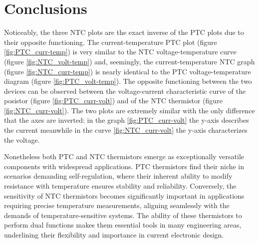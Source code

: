 \vspace{30px}\section{Conclusions}
Noticeably, the three NTC plots are the exact inverse of the PTC plots due to their opposite functioning. The current-temperature PTC plot (figure \ref{fig:PTC_curr-temp}) is very similar to the NTC voltage-temperature curve (figure \ref{fig:NTC_volt-temp}) and, seemingly, the current-temperature NTC graph (figure \ref{fig:NTC_curr-temp}) is nearly identical to the PTC voltage-temperature diagram (figure \ref{fig:PTC_volt-temp}). The opposite functioning between the two devices can be observed between the voltage-current characteristic curve of the posistor (figure \ref{fig:PTC_curr-volt}) and of the NTC thermistor (figure \ref{fig:NTC_curr-volt}). The two plots are extremely similar with the only difference that the axes are inverted: in the graph \ref{fig:PTC_curr-volt} the y-axis describes the current meanwhile in the curve \ref{fig:NTC_curr-volt} the y-axis characterizes the voltage.

Nonetheless both PTC and NTC thermistors emerge as exceptionally versatile components with widespread applications. PTC thermistors find their niche in scenarios demanding self-regulation, where their inherent ability to modify resistance with temperature ensures stability and reliability. Conversely, the sensitivity of NTC thermistors becomes significantly important in applications requiring precise temperature measurements, aligning seamlessly with the demands of temperature-sensitive systems. The ability of these thermistors to perform dual functions makes them essential tools in many engineering areas, underlining their flexibility and importance in current electronic design.